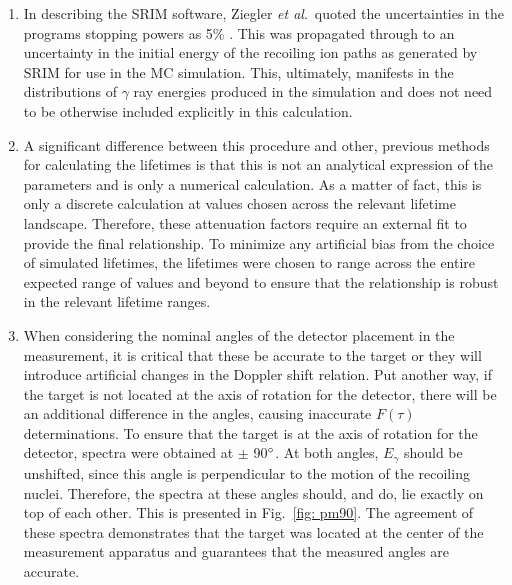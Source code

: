 \begin{enumerate}
\item In describing the SRIM software, Ziegler \textit{et al}.\ quoted the uncertainties in the programs stopping powers as 5\% \cite{Ziegler2010}. This was propagated through to an uncertainty in the initial energy of the recoiling ion paths as generated by SRIM for use in the MC simulation. This, ultimately, manifests in the distributions of $\gamma$ ray energies produced in the simulation and does not need to be otherwise included explicitly in this calculation. 
\item A significant difference between this procedure and other, previous methods for calculating the lifetimes is that this is not an analytical expression of the parameters and is only a numerical calculation. As a matter of fact, this is only a discrete calculation at values chosen across the relevant lifetime landscape. Therefore, these attenuation factors require an external fit to provide the final relationship. To minimize any artificial bias from the choice of simulated lifetimes, the lifetimes were chosen to range across the entire expected range of values and beyond to ensure that the relationship is robust in the relevant lifetime ranges. 
\item When considering the nominal angles of the detector placement in the measurement, it is critical that these be accurate to the target or they will introduce artificial changes in the Doppler shift relation. Put another way, if the target is not located at the axis of rotation for the detector, there will be an additional difference in the angles, causing inaccurate $F(\tau)$ determinations. To ensure that the target is at the axis of rotation for the detector, spectra were obtained at $\pm$ 90$\degree$. At both angles, $E_{\gamma}$ should be unshifted, since this angle is perpendicular to the motion of the recoiling nuclei. Therefore, the spectra at these angles should, and do, lie exactly on top of each other. This is presented in Fig.\ \ref{fig: pm90}. The agreement of these spectra demonstrates that the target was located at the center of the measurement apparatus and guarantees that the measured angles are accurate.


\end{enumerate}
